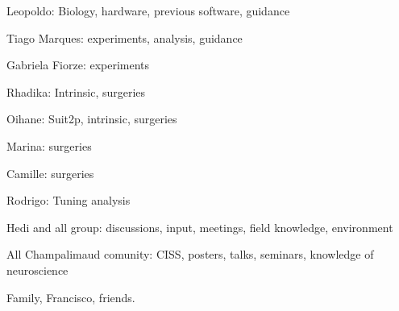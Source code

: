 
\begin{acknowledgments} 

Leopoldo: Biology, hardware, previous software, guidance

Tiago Marques: experiments, analysis, guidance

Gabriela Fiorze: experiments

Rhadika: Intrinsic, surgeries

Oihane: Suit2p, intrinsic, surgeries

Marina: surgeries

Camille: surgeries

Rodrigo: Tuning analysis

Hedi and all group: discussions, input, meetings, field knowledge, environment

All Champalimaud comunity: CISS, posters, talks, seminars, knowledge of neuroscience

Family, Francisco, friends.

\end{acknowledgments}
\clearpage
\thispagestyle{empty}
\cleardoublepage
